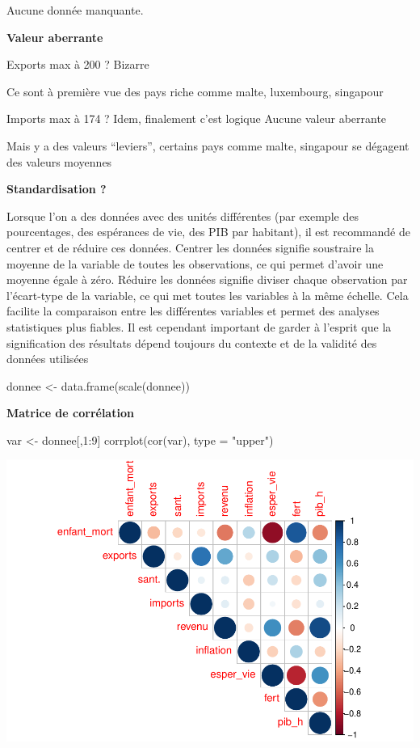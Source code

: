\documentclass[
]{article}
\newenvironment{Shaded}{}{}
\newcommand{\AttributeTok}[1]{#1}
\newcommand{\DecValTok}[1]{#1}
\newcommand{\FunctionTok}[1]{#1}
\newcommand{\NormalTok}[1]{#1}
\newcommand{\OtherTok}[1]{\textcolor[rgb]{1.00,0.25,0.00}{#1}}
\newcommand{\SpecialCharTok}[1]{\textcolor[rgb]{0.00,0.50,0.50}{#1}}
\newcommand{\StringTok}[1]{\textcolor[rgb]{0.00,0.50,0.50}{#1}}
\begin{document}
Aucune donnée manquante.

\textbf{Valeur aberrante}

Exports max à 200 ? Bizarre

Ce sont à première vue des pays riche comme malte, luxembourg, singapour

Imports max à 174 ? Idem, finalement c'est logique Aucune valeur
aberrante

Mais y a des valeurs ``leviers'', certains pays comme malte, singapour
se dégagent des valeurs moyennes

\textbf{Standardisation ?}

Lorsque l'on a des données avec des unités différentes (par exemple des
pourcentages, des espérances de vie, des PIB par habitant), il est
recommandé de centrer et de réduire ces données. Centrer les données
signifie soustraire la moyenne de la variable de toutes les
observations, ce qui permet d'avoir une moyenne égale à zéro. Réduire
les données signifie diviser chaque observation par l'écart-type de la
variable, ce qui met toutes les variables à la même échelle. Cela
facilite la comparaison entre les différentes variables et permet des
analyses statistiques plus fiables. Il est cependant important de garder
à l'esprit que la signification des résultats dépend toujours du
contexte et de la validité des données utilisées

\begin{Shaded}
\begin{Highlighting}[]
\NormalTok{donnee }\OtherTok{\textless{}{-}} \FunctionTok{data.frame}\NormalTok{(}\FunctionTok{scale}\NormalTok{(donnee))}
\end{Highlighting}
\end{Shaded}

\textbf{Matrice de corrélation}

\begin{Shaded}
\begin{Highlighting}[]
\NormalTok{var }\OtherTok{\textless{}{-}}\NormalTok{ donnee[,}\DecValTok{1}\SpecialCharTok{:}\DecValTok{9}\NormalTok{]}
\FunctionTok{corrplot}\NormalTok{(}\FunctionTok{cor}\NormalTok{(var), }\AttributeTok{type =} \StringTok{"upper"}\NormalTok{)}
\end{Highlighting}
\end{Shaded}

\includegraphics{Projet_files/figure-latex/unnamed-chunk-10-1.pdf}
\end{document}

